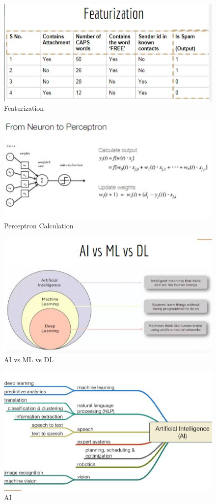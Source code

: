 \documentclass{article}
\begin{document}
\begin{figure}[htp]
\centering
\includegraphics[width=15cm]{images/featurization.JPG}
\caption{Featurization}
\label{fig: featurization}
\end{figure}

\begin{figure}[htp]
\centering
\includegraphics[width=15cm]{images/feedforwardcalc.JPG}
\caption{Perceptron Calculation}
\label{fig: calc}
\end{figure}

\begin{figure}[htp]
\centering
\includegraphics[width=15cm]{images/AIMLDL.JPG}
\caption{AI vs ML vs DL}
\label{fig: aimldl}
\end{figure}

\begin{figure}[htp]
\centering
\includegraphics[width=15cm]{images/AI.JPG}
\caption{AI}
\label{fig: ai}
\end{figure}
\end{document}
